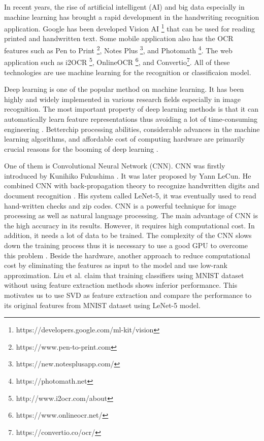 \documentclass[conference]{IEEEtran}
\begin{document}
In recent years, the rise of artificial intelligent (AI) and big data especially in machine learning has brought a rapid
development in the handwriting recognition application. 
Google has been developed Vision AI \footnote{https://developers.google.com/ml-kit/vision} that can be used for reading printed and handwritten text. 
Some mobile application also has the OCR features such as Pen to Print \footnote{https://www.pen-to-print.com},
Notes Plus \footnote{https://new.notesplusapp.com/}, and
Photomath \footnote{https://photomath.net}. The web application such as i2OCR \footnote{http://www.i2ocr.com/about}, OnlineOCR \footnote{https://www.onlineocr.net/},
and Convertio\footnote{https://convertio.co/ocr/}. All of these technologies are use machine learning for the recognition or classificaion model. 

Deep learning is one of the popular method on machine learning. It has been highly and widely implemented in various research fields especially in image recognition.
The most important property of deep learning methods is that it can automatically learn feature representations thus avoiding a lot of time-consuming engineering \cite{musab2017deep}.
Betterchip processing abilities, considerable advances in the machine learning algorithms, and affordable cost of computing hardware are primarily crucial reasons for the booming of deep learning \cite{lecun2015deep}.

One of them is Convolutional Neural Network (CNN). CNN  was firstly  introduced  by Kunihiko  Fukushima  \cite{fukushima1980neocognitron}. It  was  later proposed  by  Yann 
LeCun.  He  combined  CNN  with  back-propagation  theory  to  recognize  handwritten  digits  and 
document recognition \cite{lecun1990handwritten,lenet-5}. His system called LeNet-5, it was eventually used to read hand-written checks and zip codes.
CNN is a powerful technique for image processing as well as natural language processing. 
The main advantage of CNN is the high accuracy in its results. However, it requires high computational cost. 
In addition, it needs a lot of data to be trained. The complexity of the CNN slows down the training process thus it is necessary to use a good GPU to overcome this problem \cite{alsaafin2017minimal}.
Beside the hardware, another approach to reduce computational cost by eliminating the features as input to the model and use low-rank approximation. 
Liu et al. \cite{liu2008classification} claim that training classifiers using MNIST dataset without using feature extraction methods shows inferior performance.
This motivates us to use SVD as feature extraction and compare the performance to its original features from MNIST dataset using LeNet-5 model. 
\end{document}
